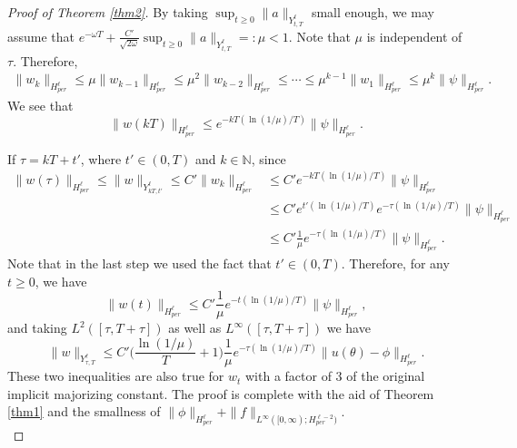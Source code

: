 \documentclass[10pt,a4paper,final]{article}
\numberwithin{equation}{section}
\newcommand{\N}{\mathbb{N}}
\newcommand{\Go}{\omega}
\begin{document}
\begin{proof}[Proof of Theorem \ref{thm2}]
By taking $\sup_{t\geq 0}\|a\|_{Y^{\ell}_{t,T}}$ small enough, we may assume that $e^{-\omega T}+\frac{C'}{\sqrt{2\Go}}\sup_{t\geq 0}\|a\|_{Y^{\ell}_{t,T}}=:\mu<1$. Note that $\mu$ is independent of $\tau$. Therefore, 
\begin{align*}
    \|w_k\|_{H^{\ell}_{per}}\leq \mu\|w_{k-1}\|_{H^{\ell}_{per}}\leq \mu^2\|w_{k-2}\|_{H^{\ell}_{per}}\leq \cdots\leq \mu^{k-1}\|w_1\|_{H^{\ell}_{per}}\leq \mu^k\|\psi\|_{H^{\ell}_{per}}.
\end{align*}
We see that 
$$\|w(kT)\|_{H^{\ell}_{per}}\leq e^{-kT(\ln(1/\mu)/T)}\|\psi\|_{H^{\ell}_{per}}.$$

If $\tau=kT+t'$, where $t'\in(0,T)$ and $k\in \N$, since 
\begin{align*}
   \|w(\tau)\|_{H^{\ell}_{per}}\leq \|w\|_{Y^{\ell}_{kT,t'}} \leq C'\|w_{k}\|_{H^{\ell}_{per}}&\leq C' e^{-kT(\ln(1/\mu)/T)}\|\psi\|_{H^{\ell}_{per}}\\
   &\leq C'e^{t'(\ln(1/\mu)/T)}e^{-\tau(\ln(1/\mu)/T)}\|\psi\|_{H^{\ell}_{per}}\\
    &\leq C'\frac{1}{\mu}e^{-\tau(\ln(1/\mu)/T)}\|\psi\|_{H^{\ell}_{per}}.
\end{align*}
Note that in the last step we used the fact that $t'\in (0,T)$.
Therefore, for any $t\geq 0$, we have 
$$\|w(t)\|_{H^{\ell}_{per}}\leq C'\frac{1}{\mu}e^{-t(\ln(1/\mu)/T)}\|\psi\|_{H^{\ell}_{per}},$$
and 
taking $L^2([\tau,T+\tau])$ as well as $L^{\infty}([\tau,T+\tau])$ we have 
$$\|w\|_{Y^{\ell}_{\tau,T}}\leq C'\bigg(\frac{\ln(1/\mu)}{T}+1\bigg)\frac{1}{\mu}e^{-\tau(\ln(1/\mu)/T)}\|u(\theta)-\phi\|_{H^{\ell}_{per}}.$$
These two inequalities are also true for $w_t$ with a factor of 3 of the original implicit majorizing constant. The proof is complete with the aid of Theorem \ref{thm1} and the smallness of $\|\phi\|_{H^{\ell}_{per}}+\|f\|_{L^\infty([0,\infty);H^{\ell-2}_{per})}$. \\

\end{proof}
\end{document}
